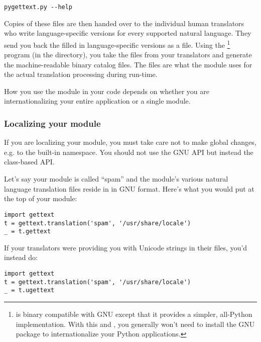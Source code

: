 \begin{verbatim}
pygettext.py --help
\end{verbatim}

Copies of these  files are then handed over to the
individual human translators who write language-specific versions for
every supported natural language.  They send you back the filled in
language-specific versions as a  file.  Using the
\footnote{ is binary
compatible with GNU  except that it provides a
simpler, all-Python implementation.  With this and
, you generally won't need to install the GNU
 package to internationalize your Python
applications.} program (in the  directory), you take the
 files from your translators and generate the
machine-readable  binary catalog files.  The 
files are what the  module uses for the actual
translation processing during run-time.

How you use the  module in your code depends on
whether you are internationalizing your entire application or a single
module.

\subsubsection{Localizing your module}

If you are localizing your module, you must take care not to make
global changes, e.g. to the built-in namespace.  You should not use
the GNU  API but instead the class-based API.  

Let's say your module is called ``spam'' and the module's various
natural language translation  files reside in
 in GNU  format.  Here's what
you would put at the top of your module:

\begin{verbatim}
import gettext
t = gettext.translation('spam', '/usr/share/locale')
_ = t.gettext
\end{verbatim}

If your translators were providing you with Unicode strings in their
 files, you'd instead do:

\begin{verbatim}
import gettext
t = gettext.translation('spam', '/usr/share/locale')
_ = t.ugettext
\end{verbatim}

